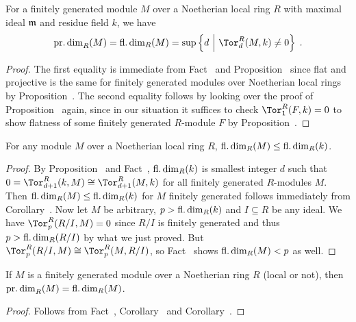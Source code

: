 \documentclass[a4paper,parskip=half,numbers=enddot, DIV=12]{scrreprt}
\begin{document}
\begin{cor}
	For a finitely generated module $M$ over a Noetherian local ring $R$ with maximal ideal $\mathfrak{m}$ and residue field $k$, we have
	\begin{align*}
		\pdim_R(M)=\fdim_R(M)=\sup\left\{d\st \Tor_d^R(M,k)\neq 0\right\}\;.
	\end{align*}
\end{cor}
\begin{proof}
	The first equality is immediate from Fact~ and Proposition~ since flat and projective is the same for finitely generated modules over Noetherian local rings by Proposition~. The second equality follows by looking over the proof of Proposition~ again, since in our situation it suffices to check $\Tor_1^R(F,k)=0$ to show flatness of some finitely generated $R$-module $F$ by Proposition~.
\end{proof}
\begin{cor}
	For any module $M$ over a Noetherian local ring $R$, $\operatorname{fl.dim}_R(M)\leq \operatorname{fl.dim}_R(k)$.
\end{cor}
\begin{proof}
	By Proposition~ and Fact~, $\operatorname{fl.dim}_R(k)$ is smallest integer $d$ such that $0=\Tor_{d+1}^R(k,M)\cong \Tor_{d+1}^R(M,k)$ for all finitely generated $R$-modules $M$. Then $\operatorname{fl.dim}_R(M)\leq \operatorname{fl.dim}_R(k)$ for $M$ finitely generated follows immediately from Corollary~. Now let $M$ be arbitrary, $p>\operatorname{fl.dim}_R(k)$ and $I\subseteq R$ be any ideal. We have $\Tor_p^R(R/I,M)=0$ since $R/I$ is finitely generated and thus $p>\operatorname{fl.dim}_R(R/I)$ by what we just proved. But $\Tor_p^R(R/I,M)\cong\Tor_p^R(M,R/I)$, so Fact~ shows $\operatorname{fl.dim}_R(M)<p$ as well.
\end{proof}
\begin{cor}
	If $M$ is a finitely generated module over a Noetherian ring $R$ (local or not), then $\operatorname{pr.dim}_R(M)=\operatorname{fl.dim}_R(M)$.
\end{cor}
\begin{proof}
	Follows from Fact~, Corollary~ and Corollary~.
\end{proof}
\end{document}
